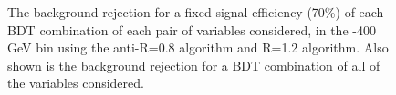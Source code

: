 \begin{figure}
\centering
{}
\caption{
The background rejection
for a fixed signal efficiency (70\%) of each BDT combination of
each pair of variables considered, in the -400 GeV bin using the anti-\kT R=0.8
algorithm and R=1.2 algorithm. Also shown is the background rejection
for a BDT combination of all of the variables considered.
}
\label{fig:pt300_comb2D}
\end{figure}


